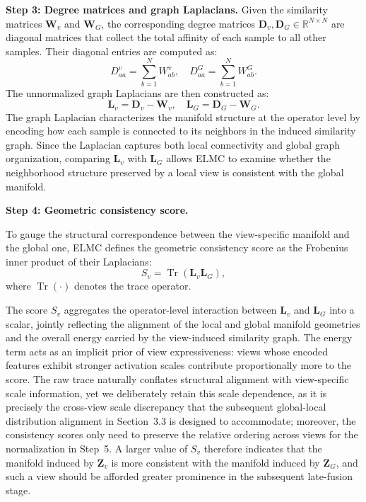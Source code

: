 \documentclass[10pt, journal, compsoc]{IEEEtran}
\newif\ifshowrevision
\newenvironment{revpar}{%
  \ifshowrevision
    \color{blue}%
  \fi
}{}
\begin{document}
\textbf{Step 3: Degree matrices and graph Laplacians.} Given the similarity matrices $\mathbf{W}_{v}$ and $\mathbf{W}_{G}$, the corresponding degree matrices $\mathbf{D}_{v},\mathbf{D}_{G}\in\mathbb{R}^{N\times N}$ are diagonal matrices that collect the total affinity of each sample to all other samples. Their diagonal entries are computed as:
\begin{equation}
D_{aa}^{v}
=
\sum_{b=1}^{N}
W_{ab}^{v},
\quad
D_{aa}^{G}
=
\sum_{b=1}^{N}
W_{ab}^{G}.
\label{eq:elmc_degree}
\end{equation}
The unnormalized graph Laplacians are then constructed as:
\begin{equation}
\mathbf{L}_{v}
=
\mathbf{D}_{v}
-
\mathbf{W}_{v},
\quad
\mathbf{L}_{G}
=
\mathbf{D}_{G}
-
\mathbf{W}_{G}.
\label{eq:elmc_laplacian}
\end{equation}
The graph Laplacian characterizes the manifold structure at the operator level by encoding how each sample is connected to its neighbors in the induced similarity graph. Since the Laplacian captures both local connectivity and global graph organization, comparing $\mathbf{L}_{v}$ with $\mathbf{L}_{G}$ allows ELMC to examine whether the neighborhood structure preserved by a local view is consistent with the global manifold.

\textbf{Step 4: Geometric consistency score.} \begin{revpar} To gauge the structural correspondence between the view-specific manifold and the global one, ELMC defines the geometric consistency score as the Frobenius inner product of their Laplacians: \end{revpar}
\begin{equation}
S_v
=
\operatorname{Tr}
\left(
\mathbf{L}_{v}\mathbf{L}_{G}
\right),
\label{eq:elmc_Sv}
\end{equation}
where $\operatorname{Tr}(\cdot)$ denotes the trace operator. \begin{revpar} The score $S_v$ aggregates the operator-level interaction between $\mathbf{L}_{v}$ and $\mathbf{L}_{G}$ into a scalar, jointly reflecting the alignment of the local and global manifold geometries and the overall energy carried by the view-induced similarity graph. The energy term acts as an implicit prior of view expressiveness: views whose encoded features exhibit stronger activation scales contribute proportionally more to the score. The raw trace naturally conflates structural alignment with view-specific scale information, yet we deliberately retain this scale dependence, as it is precisely the cross-view scale discrepancy that the subsequent global-local distribution alignment in Section~3.3 is designed to accommodate; moreover, the consistency scores only need to preserve the relative ordering across views for the normalization in Step~5. A larger value of $S_v$ therefore indicates that the manifold induced by $\mathbf{Z}_{v}$ is more consistent with the manifold induced by $\mathbf{Z}_{G}$, and such a view should be afforded greater prominence in the subsequent late-fusion stage. \end{revpar}
\end{document}

